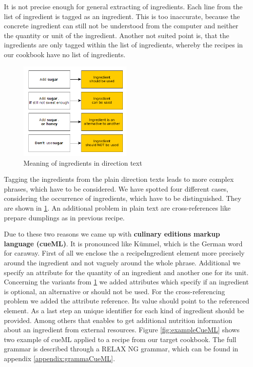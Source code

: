 \documentclass[12pt, twoside]{report}
\begin{document}
It is not precise enough for general extracting of ingredients. Each line from the list of ingredient is tagged as an ingredient. This is too inaccurate, because the concrete ingredient can still not be understood from the computer and neither the quantity or unit of the ingredient. Another not suited point is, that the ingredients are only tagged within the list of ingredients, whereby the recipes in our cookbook have no list of ingredients.

\begin{figure}
	\includegraphics[width=0.5\textwidth]{Images/ingredientsInText}
	\caption{Meaning of ingredients in direction text}
	\label{fig:ingredientsInText}
\end{figure}

Tagging the ingredients from the plain direction texts leads to more complex phrases, which have to be considered. We have spotted four different cases, considering the occurrence of ingredients, which have to be distinguished. They are shown in \cref{fig:ingredientsInText}. An additional problem in plain text are cross-references like prepare dumplings as in previous recipe.

Due to these two reasons we came up with \textbf{culinary editions markup language (cueML)}. It is pronounced like Kümmel, which is the German word for caraway. First of all we enclose the a recipeIngredient element more precisely around the ingredient and not vaguely around the whole phrase. Additional we specify an attribute for the quantity of an ingredient and another one for its unit.  Concerning the variants from \cref{fig:ingredientsInText} we added attributes which specify if an ingredient is optional, an alternative or should not be used.  For the cross-referencing problem we added the attribute reference. Its value should point to the referenced element. As a last step an unique identifier for each kind of ingredient should be provided. Among others that enables to get additional nutrition information about an ingredient from external resources. Figure \ref{fig:exampleCueML} shows two example of cueML applied to a recipe from our target cookbook. The full grammar is described through a RELAX NG grammar, which can be found in appendix \ref{appendix:grammaCueML}.   
\end{document}
